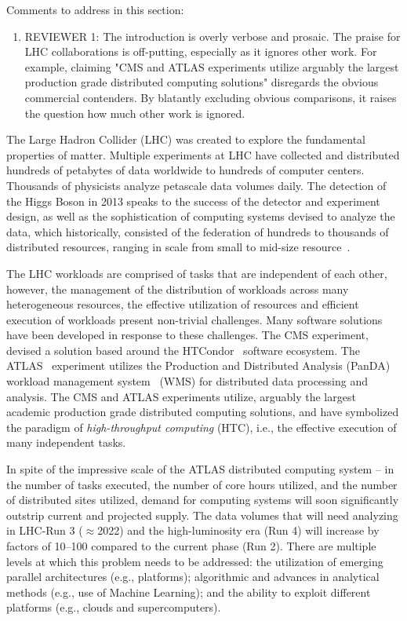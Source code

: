 \ifreview
Comments to address in this section:
\begin{enumerate}
	\color{red} 
	\item REVIEWER 1: The introduction is overly verbose and prosaic. The
	praise for LHC collaborations is off-putting, especially as it ignores
	other work. For example, claiming "CMS and ATLAS experiments utilize
	arguably the largest production grade distributed computing solutions"
	disregards the obvious commercial contenders. By blatantly excluding
	obvious comparisons, it raises the question how much other work is
	ignored. 
\end{enumerate}
\fi

The Large Hadron Collider (LHC) was created to explore the fundamental
properties of matter. Multiple experiments at LHC have collected and
distributed hundreds of petabytes of data worldwide to hundreds of computer
centers. Thousands of physicists analyze petascale data volumes daily. The
detection of the Higgs Boson in 2013 speaks to the success of the detector
and experiment design, as well as the sophistication of computing systems
devised to analyze the data, which historically, consisted of the federation
of hundreds to thousands of distributed resources, ranging in scale from
small to mid-size resource~\cite{foster2003grid}.

The LHC workloads are comprised of tasks that are independent of each other,
however, the management of the distribution of workloads across many
heterogeneous resources, the effective utilization of resources and efficient
execution of workloads present non-trivial challenges. Many software
solutions have been developed in response to these challenges. The CMS
experiment, devised a solution based around the
HTCondor~\cite{thain2005distributed} software ecosystem. The
ATLAS~\cite{Aad:2008} experiment utilizes the Production and Distributed
Analysis (PanDA) workload management system~\cite{Maeno2011} (WMS) for
distributed data processing and analysis. The CMS and ATLAS experiments
utilize, arguably the largest academic production grade distributed computing
solutions, and have symbolized the paradigm of {\it high-throughput
computing} (HTC), i.e., the effective execution of many independent tasks.

In spite of the impressive scale of the ATLAS distributed computing system --
in the number of tasks executed, the number of core hours utilized, and the
number of distributed sites utilized,  demand for computing systems will soon
significantly outstrip current and projected supply.   The data volumes that
will need analyzing in LHC-Run 3 ($\approx$2022) and the high-luminosity
era (Run 4) will increase by factors of 10--100 compared to the current phase
(Run 2). There are multiple levels at which this problem needs to be
addressed: the utilization of emerging parallel architectures (e.g.,
platforms); algorithmic and advances in analytical methods (e.g., use of
Machine Learning); and the ability to exploit different platforms (e.g.,
clouds and supercomputers).

